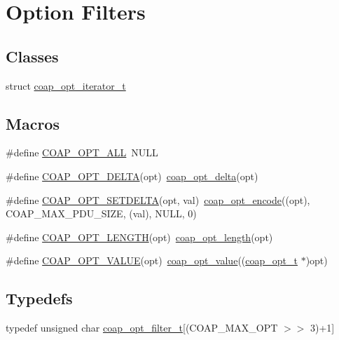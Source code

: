 \hypertarget{group__opt__filter}{}\section{Option Filters}
\label{group__opt__filter}
\subsection*{Classes}
\begin{DoxyCompactItemize}
\item 
struct \hyperlink{structcoap__opt__iterator__t}{coap\+\_\+opt\+\_\+iterator\+\_\+t}
\end{DoxyCompactItemize}
\subsection*{Macros}
\begin{DoxyCompactItemize}
\item 
\#define \hyperlink{group__opt__filter_ga81f470e9cdcc258799e10f6ed8a3ce5e}{C\+O\+A\+P\+\_\+\+O\+P\+T\+\_\+\+A\+L\+L}~N\+U\+L\+L
\item 
\#define \hyperlink{group__opt__filter_ga40b8b72ce87dcece9185a0911ec2c588}{C\+O\+A\+P\+\_\+\+O\+P\+T\+\_\+\+D\+E\+L\+T\+A}(opt)~\hyperlink{group__opt__filter_gacec6795999a3ddaa56025a70abdc1d38}{coap\+\_\+opt\+\_\+delta}(opt)
\item 
\#define \hyperlink{group__opt__filter_ga2abe054935d45806d901a90ce5c4bd5d}{C\+O\+A\+P\+\_\+\+O\+P\+T\+\_\+\+S\+E\+T\+D\+E\+L\+T\+A}(opt,  val)~\hyperlink{group__opt__filter_ga8b601ead68a35f2bcca8c101b0b93c23}{coap\+\_\+opt\+\_\+encode}((opt), C\+O\+A\+P\+\_\+\+M\+A\+X\+\_\+\+P\+D\+U\+\_\+\+S\+I\+Z\+E, (val), N\+U\+L\+L, 0)
\item 
\#define \hyperlink{group__opt__filter_gad8982f51d2fb676d4b4be50487bb8590}{C\+O\+A\+P\+\_\+\+O\+P\+T\+\_\+\+L\+E\+N\+G\+T\+H}(opt)~\hyperlink{group__opt__filter_ga5616c72178d923fb02db863c87ee249f}{coap\+\_\+opt\+\_\+length}(opt)
\item 
\#define \hyperlink{group__opt__filter_gac4348d760bb312fdc2f108ee3e8303a4}{C\+O\+A\+P\+\_\+\+O\+P\+T\+\_\+\+V\+A\+L\+U\+E}(opt)~\hyperlink{group__opt__filter_ga0f80e7bb12dca927fdf5829804c84b0e}{coap\+\_\+opt\+\_\+value}((\hyperlink{option_8h_a351867e79474c96130f738fcfbc120cc}{coap\+\_\+opt\+\_\+t} $\ast$)opt)
\end{DoxyCompactItemize}
\subsection*{Typedefs}
\begin{DoxyCompactItemize}
\item 
typedef unsigned char \hyperlink{group__opt__filter_gace614f18a4f0133a72096094c11c3b19}{coap\+\_\+opt\+\_\+filter\+\_\+t}\mbox{[}(C\+O\+A\+P\+\_\+\+M\+A\+X\+\_\+\+O\+P\+T $>$$>$ 3)+1\mbox{]}
\end{DoxyCompactItemize}
